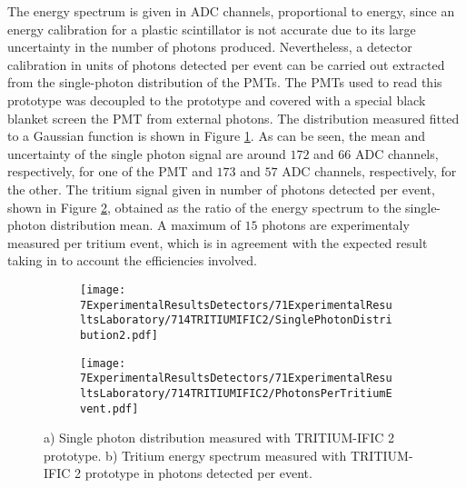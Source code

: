 The energy spectrum is given in ADC channels, proportional to energy, since an energy calibration for a plastic scintillator is not accurate due to its large uncertainty in the number of photons produced. Nevertheless, a detector calibration in units of photons detected per event can be carried out extracted from the single-photon distribution of the PMTs. The PMTs used to read this prototype was decoupled to the prototype and covered with a special black blanket screen the PMT from external photons. The distribution measured fitted to a Gaussian function is shown in Figure \ref{subfig:SinglePhotonDistributionIFIC2}. As can be seen, the mean and uncertainty of the single photon signal are around $172$ and $66$ ADC channels, respectively, for one of the PMT and $173$ and $57$ ADC channels, respectively, for the other. The tritium signal given in number of photons detected per event, shown in Figure \ref{subfig:TritiumSignalTRITIUMIFIC2}, obtained as the ratio of the energy spectrum to the single-photon distribution mean. A maximum of $15$ photons are experimentaly measured per tritium event, which is in agreement with the expected result taking in to account the efficiencies involved. 

\begin{figure}
\centering
    \begin{subfigure}[b]{0.73\textwidth}
    \centering
    \texttt{[image: 7ExperimentalResultsDetectors/71ExperimentalResultsLaboratory/714TRITIUMIFIC2/SinglePhotonDistribution2.pdf]}  
    \caption{\label{subfig:SinglePhotonDistributionIFIC2}}
    \end{subfigure}
    \hfill
    \begin{subfigure}[b]{0.73\textwidth}
    \centering
    \texttt{[image: 7ExperimentalResultsDetectors/71ExperimentalResultsLaboratory/714TRITIUMIFIC2/PhotonsPerTritiumEvent.pdf]}  
    \caption{\label{subfig:TritiumSignalTRITIUMIFIC2}}
    \end{subfigure}
 \caption{a) Single photon distribution measured with TRITIUM-IFIC 2 prototype. b) Tritium energy spectrum measured with TRITIUM-IFIC 2 prototype in photons detected per event.}
 \label{fig:PhotonsPerTritiumEventIFIC2}
\end{figure}


